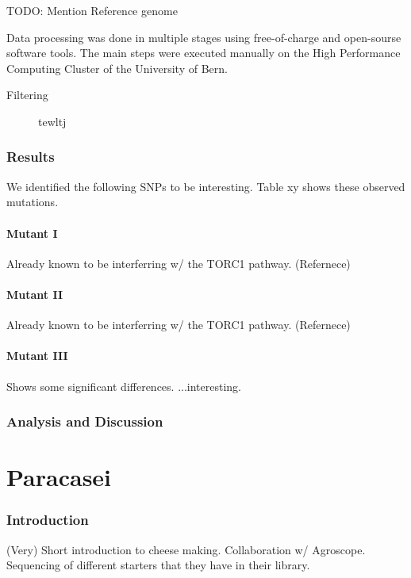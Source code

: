 \documentclass[10pt,a4paper]{article}
\begin{document}
TODO: Mention Reference genome

Data processing was done in multiple stages using free-of-charge and open-sourse software tools. The main steps were executed manually on the High Performance Computing Cluster of the University of Bern.

\begin{description}
\item[Filtering] tewltj
\end{description}

\section{Results}

We identified the following SNPs to be interesting. Table xy shows these observed mutations.

\subsection{Mutant I}
Already known to be interferring w/ the TORC1 pathway. (Refernece)

\subsection{Mutant II}
Already known to be interferring w/ the TORC1 pathway. (Refernece)

\subsection{Mutant III}
Shows some significant differences. ...interesting.

\section{Analysis and Discussion}

\pagebreak
\part{Paracasei}
\setcounter{section}{0}

\section{Introduction}
(Very) Short introduction to cheese making. Collaboration w/ Agroscope. Sequencing of different starters that they have in their library.
\end{document}

